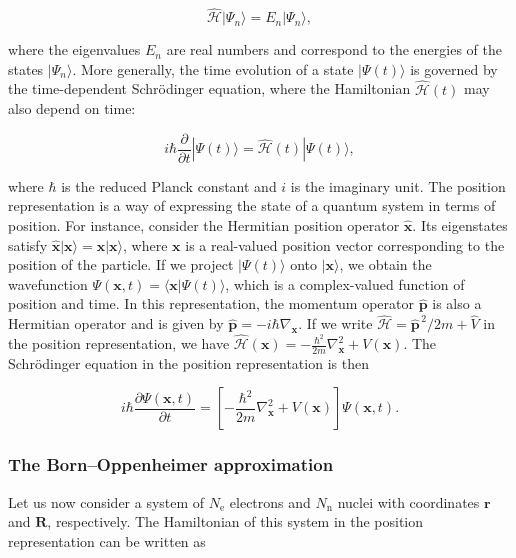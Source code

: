 \documentclass[12pt,a4paper]{article}
\numberwithin{equation}{section}
\begin{document}
\begin{equation}
  \hat{\mathcal H}|\Psi_n\rangle=E_n|\Psi_n\rangle,
  \label{eq:schrodinger}
\end{equation}

where the eigenvalues $E_n$ are real numbers and correspond to the energies of the states $|\Psi_n\rangle$.
More generally, the time evolution of a state $|\Psi(t)\rangle$ is governed by the time-dependent Schrödinger equation,
where the Hamiltonian $\hat{\mathcal H}(t)$ may also depend on time:

\begin{equation}
  i\hbar\frac{\partial}{\partial t}|\Psi(t)\rangle
    =\hat{\mathcal H}(t)|\Psi(t)\rangle,
  \label{eq:time-dependent-schrodinger}
\end{equation}

where $\hbar$ is the reduced Planck constant and $i$ is the imaginary unit.
The position representation is a way of expressing the state of a quantum system in terms of position.
For instance, consider the Hermitian position operator $\hat{\bm x}$.
Its eigenstates satisfy $\hat{\bm x}|\bm x\rangle=\bm x|\bm x\rangle$,
where $\bm x$ is a real-valued position vector corresponding to the position of the particle.
If we project $|\Psi(t)\rangle$ onto $|\bm x\rangle$, we obtain the wavefunction $\Psi(\bm x,t)=\langle\bm x|\Psi(t)\rangle$,
which is a complex-valued function of position and time.
In this representation, the momentum operator $\hat{\bm p}$ is also a Hermitian operator and is given by $\hat{\bm p}=-i\hbar\nabla_{\bm x}$.
If we write $\hat{\mathcal H}=\hat{\bm p}^{\,2}/2m + \hat V$ in the position representation,
we have $\hat{\mathcal H}(\bm x)=-\frac{\hbar^2}{2m}\nabla_{\bm x}^2+V(\bm x)$.
The Schrödinger equation in the position representation is then

\begin{equation}
  i\hbar\frac{\partial\Psi(\bm x,t)}{\partial t}
   =\left[-\frac{\hbar^2}{2m}\nabla_{\bm x}^2+V(\bm x)\right]\Psi(\bm x,t).
  \label{eq:full-schrodinger}
\end{equation}

\subsubsection{The Born--Oppenheimer approximation}
\label{sec:bo}

Let us now consider a system of $N_{\mathrm e}$ electrons and $N_{\mathrm n}$ nuclei with coordinates $\bm r$ and $\bm R$, respectively.
The Hamiltonian of this system in the position representation can be written as
\end{document}

